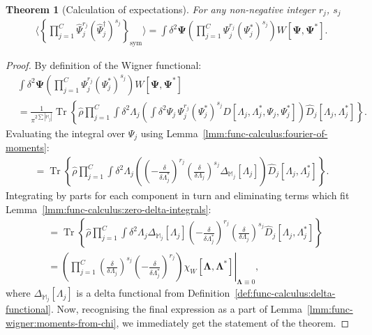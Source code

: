 \documentclass[12pt,aip,jmp,amssymb,amsmath]{revtex4-1}
\newcommand{\bLambda}{\boldsymbol{\Lambda}}
\newcommand{\bPsi}{\boldsymbol{\Psi}}
\newcommand{\Trace}[1]{\operatorname{Tr} \left\{ #1 \right\}}
\newcommand{\symprod}[1]{\left\{ #1 \right\}_{\mathrm{sym}}}
\newcommand{\Psiop}{\hat{\Psi}}
\newcommand{\restbasis}{\mathbb{M}}
\newcommand{\lmmref}[1]{Lemma~\ref{lmm:#1}}
\newcommand{\defref}[1]{Definition~\ref{def:#1}}
\newtheorem{theorem}{Theorem}
\begin{document}
\begin{theorem}[Calculation of expectations]
\label{thm:func-wigner:moments}
    For any non-negative integer $r_j$, $s_j$
    \begin{equation*}\begin{split}
        \langle \symprod{ \prod_{j=1}^C \Psiop_j^{r_j} (\Psiop_j^\dagger)^{s_j} } \rangle
        = \int \delta^2 \bPsi
            \left( \prod_{j=1}^C \Psi_j^{r_j} (\Psi_j^*)^{s_j} \right) W[\bPsi, \bPsi^*].
    \end{split}\end{equation*}
\end{theorem}
\begin{proof}
By definition of the Wigner functional:
\begin{equation}\begin{split}
    & \int \delta^2\bPsi \left( \prod_{j=1}^C \Psi_j^{r_j} (\Psi_j^*)^{s_j} \right) W[\bPsi, \bPsi^*] \\
    & = \frac{1}{\pi^{2\sum|\restbasis_j|}} \Trace{ \hat{\rho}
        \prod_{j=1}^C
            \int \delta^2 \Lambda_j \left(
                \int \delta^2 \Psi_j\, \Psi_j^{r_j} (\Psi_j^*)^{s_j}
                D[\Lambda_j, \Lambda_j^*, \Psi_j, \Psi_j^*]
            \right)
            \hat{D}_j[\Lambda_j, \Lambda_j^*]
    }.
\end{split}\end{equation}
Evaluating the integral over $\Psi_j$ using \lmmref{func-calculus:fourier-of-moments}:
\begin{equation}\begin{split}
    = \Trace{ \hat{\rho}
        \prod_{j=1}^C
            \int \delta^2 \Lambda_j \left(
                \left( -\frac{\delta}{\delta \Lambda_j^*} \right)^{r_j}
                \left( \frac{\delta}{\delta \Lambda_j} \right)^{s_j}
                \Delta_{\restbasis_j}[\Lambda_j]
            \right)
            \hat{D}_j[\Lambda_j, \Lambda_j^*]
    }.
\end{split}\end{equation}
Integrating by parts for each component in turn and eliminating terms which fit \lmmref{func-calculus:zero-delta-integrals}:
\begin{equation}\begin{split}
    & = \Trace{ \hat{\rho}
        \prod_{j=1}^C \int \delta^2 \Lambda_j
            \Delta_{\restbasis_j}[\Lambda_j]
            \left( -\frac{\delta}{\delta \Lambda_j^*} \right)^{r_j}
            \left( \frac{\delta}{\delta \Lambda_j} \right)^{s_j}
            \hat{D}_j[\Lambda_j, \Lambda_j^*]
    } \\
    & = \left.
        \left(
            \prod_{j=1}^C
            \left( \frac{\delta}{\delta \Lambda_j} \right)^{s_j}
            \left( -\frac{\delta}{\delta \Lambda_j^*} \right)^{r_j}
        \right)
        \chi_W [\bLambda, \bLambda^*]
    \right|_{\bLambda \equiv 0},
\end{split}\end{equation}
where $\Delta_{\restbasis_j}[\Lambda_j]$ is a delta functional from \defref{func-calculus:delta-functional}.
Now, recognising the final expression as a part of \lmmref{func-wigner:moments-from-chi},
we immediately get the statement of the theorem.
\end{proof}
\end{document}
